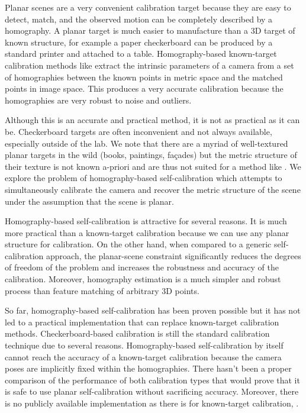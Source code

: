 \documentclass[10pt,twocolumn,letterpaper]{article}
\begin{document}
Planar scenes are a very convenient calibration target because they are easy to detect, match, and the observed motion can be completely described by a homography. A planar target is much easier to manufacture than a 3D target of known structure, for example a paper checkerboard can be produced by a standard printer and attached to a table. Homography-based known-target calibration methods like \cite{zhang1999} extract the intrinsic parameters of a camera from a set of homographies between the known points in metric space and the matched points in image space. This produces a very accurate calibration because the homographies are very robust to noise and outliers. 

Although this is an accurate and practical method, it is not as practical as it can be. Checkerboard targets are often inconvenient and not always available, especially outside of the lab. We note that there are a myriad of well-textured planar targets in the wild (books, paintings, fa\c{c}ades) but the metric structure of their texture is not known a-priori and are thus not suited for a method like \cite{zhang1999}. We explore the problem of homography-based self-calibration which attempts to simultaneously calibrate the camera and recover the metric structure of the scene under the assumption that the scene is planar.

Homography-based self-calibration is attractive for several reasons. It is much more practical than a known-target calibration because we can use any planar structure for calibration. On the other hand, when compared to a generic self-calibration approach, the planar-scene constraint significantly reduces the degrees of freedom of the problem and increases the robustness and accuracy of the calibration. Moreover, homography estimation is a much simpler and robust process than feature matching of arbitrary 3D points.

So far, homography-based self-calibration has been proven possible \cite{triggs1998} but it has not led to a practical implementation that can replace known-target calibration methods. Checkerboard-based calibration is still the standard calibration technique due to several reasons. Homography-based self-calibration by itself cannot reach the accuracy of a known-target calibration because the camera poses are implicitly fixed within the homographies. There hasn't been a proper comparison of the performance of both calibration types that would prove that it is safe to use planar self-calibration without sacrificing accuracy. Moreover, there is no publicly available implementation as there is for known-target calibration, \eg \cite{bouguetMCT}. 
\end{document}
